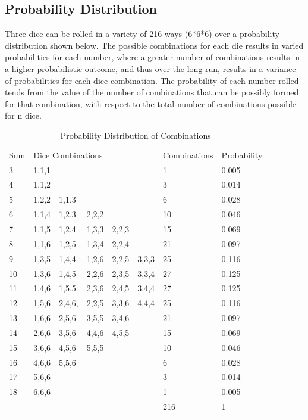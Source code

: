 \documentclass[12pt]{article}
\begin{document}
\subsection{Probability Distribution}
Three dice can be rolled in a variety of 216 ways (6*6*6) over a probability distribution shown below. The possible combinations for each die results in varied probabilities for each number, where a greater number of combinations results in a higher probabilistic outcome, and thus over the long run, results in a variance of probabilities for each dice combination. The probability of each number rolled tends from the value of the number of combinations that can be possibly formed for that combination, with respect to the total number of combinations possible for n dice.
\begin{table}[h]
\centering
\begin{tabular}{llllllll}
Sum & \multicolumn{5}{l}{Dice Combinations}  & Combinations & Probability \\
3            & 1,1,1 &        &       &       &       & 1                  & 0.005       \\
4            & 1,1,2 &        &       &       &       & 3                  & 0.014       \\
5            & 1,2,2 & 1,1,3  &       &       &       & 6                  & 0.028       \\
6            & 1,1,4 & 1,2,3  & 2,2,2 &       &       & 10                 & 0.046       \\
7            & 1,1,5 & 1,2,4  & 1,3,3 & 2,2,3 &       & 15                 & 0.069       \\
8            & 1,1,6 & 1,2,5  & 1,3,4 & 2,2,4 &       & 21                 & 0.097       \\
9            & 1,3,5 & 1,4,4  & 1,2,6 & 2,2,5 & 3,3,3 & 25                 & 0.116       \\
10           & 1,3,6 & 1,4,5  & 2,2,6 & 2,3,5 & 3,3,4 & 27                 & 0.125       \\
11           & 1,4,6 & 1,5,5  & 2,3,6 & 2,4,5 & 3,4,4 & 27                 & 0.125       \\
12           & 1,5,6 & 2,4,6, & 2,2,5 & 3,3,6 & 4,4,4 & 25                 & 0.116       \\
13           & 1,6,6 & 2,5,6  & 3,5,5 & 3,4,6 &       & 21                 & 0.097       \\
14           & 2,6,6 & 3,5,6  & 4,4,6 & 4,5,5 &       & 15                 & 0.069       \\
15           & 3,6,6 & 4,5,6  & 5,5,5 &       &       & 10                 & 0.046       \\
16           & 4,6,6 & 5,5,6  &       &       &       & 6                  & 0.028       \\
17           & 5,6,6 &        &       &       &       & 3                  & 0.014       \\
18           & 6,6,6 &        &       &       &       & 1                  & 0.005       \\
             &       &        &       &       &       & 216                & 1          
\end{tabular}
\caption{Probability Distribution of Combinations}
\end{table}
\end{document}
